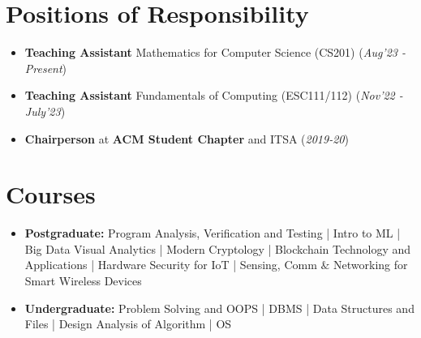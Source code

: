 \documentclass[10.8pt, a4paper]{extarticle}
\newcommand{\shorterSection}[1]{\vspace{-10pt}\section{#1}}
\begin{document}
\shorterSection{Positions of Responsibility}
\vspace{-2pt}
\begin{itemize}
    \item \textbf{Teaching Assistant} Mathematics for Computer Science (CS201) \hfill\hfill(\textit{Aug'23 - Present})
    \item \textbf{Teaching Assistant} Fundamentals of Computing (ESC111/112) \hfill\hfill(\textit{Nov'22 - July'23})
    \item \textbf{Chairperson} at \textbf{ACM Student Chapter} and ITSA \hfill\hfill(\textit{2019-20})
\end{itemize}

\shorterSection{Courses}
\vspace{-2pt}
\begin{itemize}
  \item \textbf{Postgraduate:}
    Program Analysis, Verification and Testing |
    Intro to ML |
    Big Data Visual Analytics |
    Modern Cryptology |
    Blockchain Technology and Applications |
    Hardware Security for IoT |
    Sensing, Comm $\&$ Networking for Smart Wireless Devices
  \item \textbf{Undergraduate:}
    Problem Solving and OOPS |
    DBMS |
    Data Structures and Files |
    Design Analysis of Algorithm |
    OS
\end{itemize}
\end{document}
